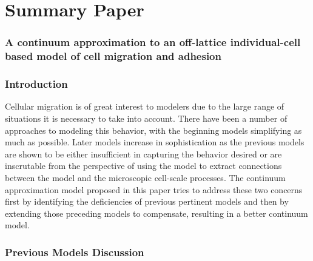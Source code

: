 \documentclass[12pt,letterpaper,cm]{article}
\renewcommand{\.}{\cdot}
\newcommand{\<}{\langle}
\renewcommand{\>}{\rangle}
\begin{document}
	
	
	
	\part*{Summary Paper}
	\section*{A continuum approximation to an off-lattice individual-cell based model of cell migration and adhesion \cite{Middleton2014} }
	
	
	
%	
%	
%	
%	
%	
%	
%	
%	
%	


	\section{Introduction}
	\indent 
	
	Cellular migration is of great interest to modelers due to the large range of situations it is necessary to take into account.  There have been a number of approaches to modeling this behavior, with the beginning models simplifying as much as possible.  Later models increase in sophistication as the previous models are shown to be either insufficient in capturing the behavior desired or are inscrutable from the perspective of using the model to extract connections between the model and the microscopic cell-scale processes.  The continuum approximation model proposed in this paper tries to address these two concerns first by identifying the deficiencies of previous pertinent models and then by extending those preceding models to compensate, resulting in a better continuum model.   
	\section{Previous Models Discussion}
	\indent
	
\end{document}

